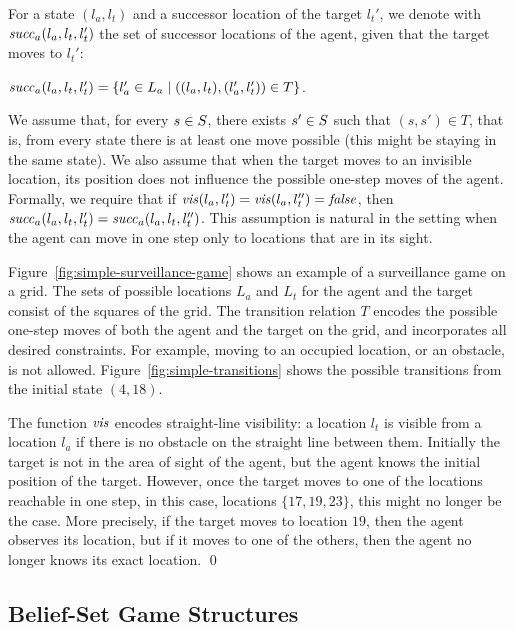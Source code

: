 For a state $(l_a,l_t)$ and a successor location of the target $l_t'$, we denote with $\mathit{succ}_a(l_a,l_t,l_t')$ the set of successor locations of the agent, given that the target moves to $l_t'$: 

$\mathit{succ}_a(l_a,l_t,l_t') = \{l_a' \in L_a \mid  ((l_a,l_t),(l_a',l_t')) \in T\}$.

We assume that, for every $s \in S$, there exists $s' \in S$ such that $(s,s') \in T$, that is, from every state there is at least one move possible (this might be staying in the same state). We also assume that when the target moves to an invisible location, its position does not influence the possible one-step moves of the agent. Formally, we require that if $\mathit{vis}(l_a,l_t') = \mathit{vis}(l_a,l_t'')=\mathit{false}$, then $\mathit{succ}_a(l_a,l_t,l_t') = \mathit{succ}_a(l_a,l_t,l_t'')$. This assumption is natural in the setting when the agent can move in one step only to locations that are in its sight.

\begin{example}\label{ex:simple-surveillance-game}
Figure~\ref{fig:simple-surveillance-game} shows an example of a surveillance game on a grid.  The sets of possible locations $L_a$ and $L_t$ for the agent and the target consist of the squares of the  grid. The transition relation $T$ encodes the possible one-step moves of both the agent and the target on the grid, and incorporates all desired constraints. For example, moving to an occupied location, or an obstacle, is not allowed. Figure~\ref{fig:simple-transitions} shows the possible transitions from the initial state $(4,18)$.

The function $\mathit{vis}$ encodes straight-line visibility: a location $l_t$ is visible from a location $l_a$ if there is no obstacle on the straight line between them. Initially the target is not in the area of sight of the agent, but the agent knows the initial position of the target. However, once the target moves to one of the locations reachable in one step, in this case, locations $\{17,19,23\}$, this might no longer be the case. More precisely, if the target moves to location $19$, then the agent observes its location, but if it moves to one of the others, then the agent no longer knows its exact location. \qed
\end{example}




\subsection{Belief-Set Game Structures}

